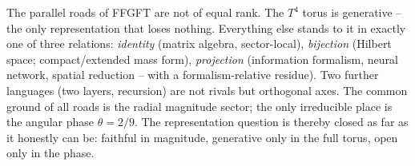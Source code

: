 \begin{conclusionBox}
The parallel roads of FFGFT are not of equal rank. The $T^4$ torus is generative -- the only
representation that loses nothing. Everything else stands to it in exactly one of three relations:
\emph{identity} (matrix algebra, sector-local), \emph{bijection} (Hilbert space; compact/extended mass
form), \emph{projection} (information formalism, neural network, spatial reduction -- with a
formalism-relative residue). Two further languages (two layers, recursion) are not rivals but
orthogonal axes. The common ground of all roads is the radial magnitude sector; the only irreducible
place is the angular phase $\theta=2/9$. The representation question is thereby closed as far as it
honestly can be: faithful in magnitude, generative only in the full torus, open only in the phase.
\end{conclusionBox}
